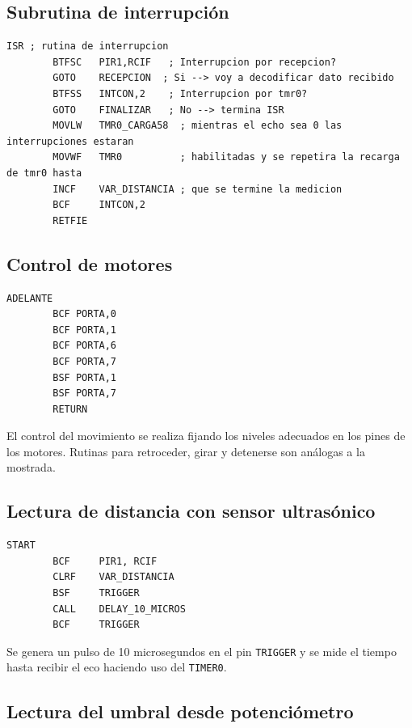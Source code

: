 \documentclass[]{article}
\begin{document}
	\subsection{Subrutina de interrupción}
	\begin{lstlisting}[caption={Subrutina de interrupción}, label={lst:isr}]
		ISR ; rutina de interrupcion
		BTFSC   PIR1,RCIF	; Interrupcion por recepcion?
		GOTO    RECEPCION  ; Si --> voy a decodificar dato recibido
		BTFSS   INTCON,2	; Interrupcion por tmr0?
		GOTO    FINALIZAR	; No --> termina ISR
		MOVLW   TMR0_CARGA58  ; mientras el echo sea 0 las interrupciones estaran 
		MOVWF   TMR0          ; habilitadas y se repetira la recarga de tmr0 hasta
		INCF    VAR_DISTANCIA ; que se termine la medicion
		BCF	    INTCON,2
		RETFIE
	\end{lstlisting}
	
	\subsection{Control de motores}
	
	\begin{lstlisting}[caption={Rutina para avanzar}, label={lst:adelante}]
		ADELANTE
		BCF	PORTA,0
		BCF	PORTA,1
		BCF	PORTA,6
		BCF	PORTA,7
		BSF	PORTA,1
		BSF	PORTA,7
		RETURN
	\end{lstlisting}
	
	El control del movimiento se realiza fijando los niveles adecuados en los pines de los motores. Rutinas para retroceder, girar y detenerse son análogas a la mostrada.
	
	\subsection{Lectura de distancia con sensor ultrasónico}
	
	\begin{lstlisting}[caption={Inicio de medición ultrasónica}, label={lst:ultrasonico}]
		START 
		BCF     PIR1, RCIF
		CLRF    VAR_DISTANCIA
		BSF     TRIGGER
		CALL    DELAY_10_MICROS
		BCF     TRIGGER
	\end{lstlisting}
	
	Se genera un pulso de 10 microsegundos en el pin \texttt{TRIGGER} y se mide el tiempo hasta recibir el eco haciendo uso del \texttt{TIMER0}.
	
	\subsection{Lectura del umbral desde potenciómetro}
	
\end{document}
